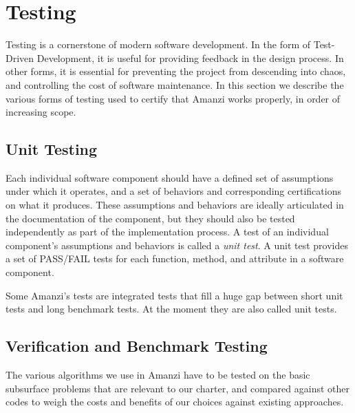 
\section{Testing}
Testing is a cornerstone of modern software development. In the form of Test-Driven
Development, it is useful for providing feedback in the design process. In other 
forms, it is essential for preventing the project from descending into chaos, and 
controlling the cost of software maintenance. In this section we describe the 
various forms of testing used to certify that Amanzi works properly, in order of 
increasing scope.



\subsection{Unit Testing}
Each individual software component should have a defined set of assumptions under 
which it operates, and a set of behaviors and corresponding certifications on 
what it produces. These assumptions and behaviors are ideally articulated in the 
documentation of the component, but they should also be tested independently as part
of the implementation process. A test of an individual component's assumptions and 
behaviors is called a {\em unit test}. A unit test provides a set of PASS/FAIL tests for 
each function, method, and attribute in a software component.

Some Amanzi's tests are integrated tests that fill a huge gap between short unit tests
and long benchmark tests.
At the moment they are also called unit tests. 



\subsection{Verification and Benchmark Testing}
The various algorithms we use in Amanzi have to be tested on the basic subsurface 
problems that are relevant to our charter, and compared against other codes to 
weigh the costs and benefits of our choices against existing approaches. 

